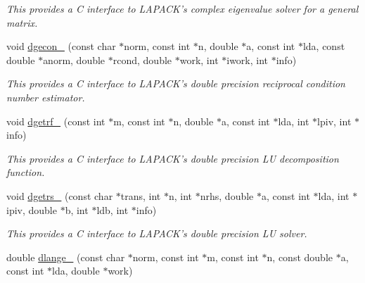 \begin{DoxyCompactItemize}
\begin{DoxyCompactList}\small\item\em This provides a C interface to L\-A\-P\-A\-C\-K's complex eigenvalue solver for a general matrix. \end{DoxyCompactList}\item 
\hypertarget{namespacekeycpp_aca3be6524e195662cbb74a810305e721}{void \hyperlink{namespacekeycpp_aca3be6524e195662cbb74a810305e721}{dgecon\-\_\-} (const char $\ast$norm, const int $\ast$n, double $\ast$a, const int $\ast$lda, const double $\ast$anorm, double $\ast$rcond, double $\ast$work, int $\ast$iwork, int $\ast$info)}\label{namespacekeycpp_aca3be6524e195662cbb74a810305e721}

\begin{DoxyCompactList}\small\item\em This provides a C interface to L\-A\-P\-A\-C\-K's double precision reciprocal condition number estimator. \end{DoxyCompactList}\item 
\hypertarget{namespacekeycpp_a75e334ffaf1864d7191e9e0b64189783}{void \hyperlink{namespacekeycpp_a75e334ffaf1864d7191e9e0b64189783}{dgetrf\-\_\-} (const int $\ast$m, const int $\ast$n, double $\ast$a, const int $\ast$lda, int $\ast$lpiv, int $\ast$info)}\label{namespacekeycpp_a75e334ffaf1864d7191e9e0b64189783}

\begin{DoxyCompactList}\small\item\em This provides a C interface to L\-A\-P\-A\-C\-K's double precision L\-U decomposition function. \end{DoxyCompactList}\item 
\hypertarget{namespacekeycpp_ab9c33788a2c083aa5738eda1fe62a261}{void \hyperlink{namespacekeycpp_ab9c33788a2c083aa5738eda1fe62a261}{dgetrs\-\_\-} (const char $\ast$trans, int $\ast$n, int $\ast$nrhs, double $\ast$a, const int $\ast$lda, int $\ast$ipiv, double $\ast$b, int $\ast$ldb, int $\ast$info)}\label{namespacekeycpp_ab9c33788a2c083aa5738eda1fe62a261}

\begin{DoxyCompactList}\small\item\em This provides a C interface to L\-A\-P\-A\-C\-K's double precision L\-U solver. \end{DoxyCompactList}\item 
\hypertarget{namespacekeycpp_a4507ef954be960fec70ca0f93258d730}{double \hyperlink{namespacekeycpp_a4507ef954be960fec70ca0f93258d730}{dlange\-\_\-} (const char $\ast$norm, const int $\ast$m, const int $\ast$n, const double $\ast$a, const int $\ast$lda, double $\ast$work)}\label{namespacekeycpp_a4507ef954be960fec70ca0f93258d730}


\end{DoxyCompactItemize}
